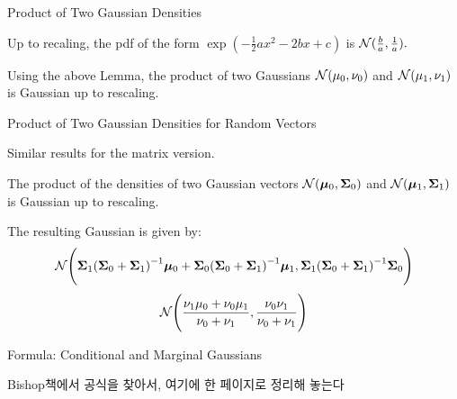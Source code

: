 \documentclass[handout,fleqn,aspectratio=169]{beamer}
\begin{document}
\begin{frame}{Product of Two Gaussian Densities}

\plitemsep 0.1in
\bci 
\item {} Up to recaling, the pdf of the form $\exp(-\frac{1}{2} ax^2 -2bx +c)$ is $\mathcal N(\frac{b}{a},\frac{1}{a}).$  

\medskip
\item Using the above Lemma, the product of two Gaussians $\mathcal N(\mu_0,\nu_0)$ and $\mathcal N(\mu_1,\nu_1)$ is Gaussian up to rescaling. 

\medskip
{}

\eci
\end{frame}

\begin{frame}{Product of Two Gaussian Densities for Random Vectors}

\plitemsep 0.1in
\bci 
\item Similar results for the matrix version.

\item The product of the densities of two Gaussian vectors $\mathcal N(\bm{\mu}_0,\bm{\Sigma}_0)$ and $\mathcal N(\bm{\mu}_1,\bm{\Sigma}_1)$ is Gaussian up to rescaling. 

\item The resulting Gaussian is given by:
$$
\mathcal N\Bigg(\bm{\Sigma}_1 {{(\bm{\Sigma}_0 + \bm{\Sigma}_1)}^{-1}} \bm{\mu}_0 + \bm{\Sigma}_0{{(\bm{\Sigma}_0 + \bm{\Sigma}_1)}^{-1}}\bm{\mu}_1,
\bm{\Sigma}_1{{(\bm{\Sigma}_0 + \bm{\Sigma}_1)}^{-1}}\bm{\Sigma}_0
\Bigg)
$$
$$
\mathcal N\Bigg(\frac{\nu_1\mu_0 + \nu_0\mu_1}{\nu_0 + \nu_1}, \frac{\nu_0\nu_1}{\nu_0+\nu_1} \Bigg)
$$
\eci
\end{frame}

\begin{frame}{Formula: Conditional and Marginal Gaussians}

{\Large \red Bishop책에서 공식을 찾아서, 여기에 한 페이지로 정리해 놓는다}

\plitemsep 0.1in
\bci 
\item 
\eci
\end{frame}
\end{document}
